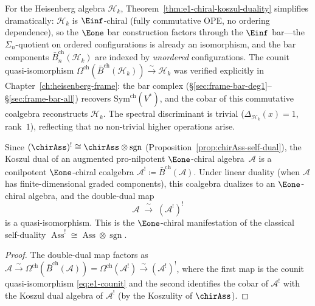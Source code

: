 \begin{example}\label{ex:heisenberg-e1-duality}
For the Heisenberg algebra $\mathcal{H}_k$,
Theorem~\ref{thm:e1-chiral-koszul-duality} simplifies dramatically:
$\mathcal{H}_k$ is $\Einf$-chiral (fully commutative OPE, no
ordering dependence), so the $\Eone$ bar construction factors
through the $\Einf$ bar---the $\Sigma_n$-quotient on ordered
configurations is already an isomorphism, and the bar components
$\bar{B}_n^{\mathrm{ch}}(\mathcal{H}_k)$ are indexed by
\emph{unordered} configurations.
The counit quasi-isomorphism
$\Omega^{\mathrm{ch}}(\bar{B}^{\mathrm{ch}}(\mathcal{H}_k))
\xrightarrow{\sim} \mathcal{H}_k$
was verified explicitly in
Chapter~\ref{ch:heisenberg-frame}:
the bar complex
(\S\ref{sec:frame-bar-deg1}--\S\ref{sec:frame-bar-all})
recovers $\mathrm{Sym}^{\mathrm{ch}}(V^*)$, and the cobar of
this commutative coalgebra reconstructs $\mathcal{H}_k$.
The spectral discriminant is trivial ($\Delta_{\mathcal{H}_k}(x)=1$,
rank~$1$), reflecting that no non-trivial higher operations arise.
\end{example}

\begin{corollary}
\label{cor:e1-self-duality}
Since
$(\chirAss)^! \cong \chirAss \otimes \operatorname{sgn}$
(Proposition~\ref{prop:chirAss-self-dual}), the Koszul dual
of an augmented pro-nilpotent
$\Eone$\nobreakdash-chiral algebra~$\mathcal{A}$ is a
conilpotent $\Eone$\nobreakdash-chiral coalgebra
$\mathcal{A}^! \coloneqq \bar{B}^{\mathrm{ch}}(\mathcal{A})$.
Under linear duality (when $\mathcal{A}$ has
finite-dimensional graded components), this coalgebra
dualizes to an $\Eone$\nobreakdash-chiral algebra, and
the double-dual map
\[
\mathcal{A} \;\xrightarrow{\;\sim\;}\;
(\mathcal{A}^!)^!
\]
is a quasi-isomorphism.  This is the $\Eone$-chiral manifestation
of the classical self-duality $\operatorname{Ass}^! \cong
\operatorname{Ass} \otimes \operatorname{sgn}$.
\end{corollary}

\begin{proof}
The double-dual map factors as
$\mathcal{A} \xrightarrow{\sim}
\Omega^{\mathrm{ch}}(\bar{B}^{\mathrm{ch}}(\mathcal{A}))
= \Omega^{\mathrm{ch}}(\mathcal{A}^!)
\xrightarrow{\sim} (\mathcal{A}^!)^!$,
where the first map is the counit quasi-isomorphism
\eqref{eq:e1-counit} and the second identifies the cobar of
$\mathcal{A}^!$ with the Koszul dual algebra of $\mathcal{A}^!$
(by the Koszulity of $\chirAss$).
\end{proof}

